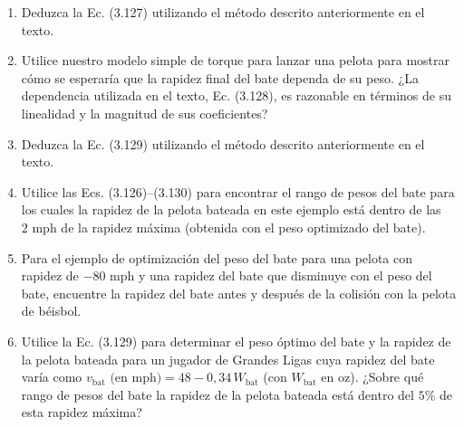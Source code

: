 \documentclass[12pt]{book}
\begin{document}
\begin{enumerate}
\item[3.159] Deduzca la Ec. (3.127) utilizando el método descrito anteriormente en el texto.

\item[3.160] Utilice nuestro modelo simple de torque para lanzar una pelota para mostrar cómo se esperaría que la rapidez final del bate dependa de su peso. ¿La dependencia utilizada en el texto, Ec. (3.128), es razonable en términos de su linealidad y la magnitud de sus coeficientes?

\item[3.161] Deduzca la Ec. (3.129) utilizando el método descrito anteriormente en el texto.

\item[3.162] Utilice las Ecs. (3.126)--(3.130) para encontrar el rango de pesos del bate para los cuales la rapidez de la pelota bateada en este ejemplo está dentro de las $2\text{ mph}$ de la rapidez máxima (obtenida con el peso optimizado del bate).

\item[3.163] Para el ejemplo de optimización del peso del bate para una pelota con rapidez de $-80\text{ mph}$ y una rapidez del bate que disminuye con el peso del bate, encuentre la rapidez del bate antes y después de la colisión con la pelota de béisbol.

\item[3.164] Utilice la Ec. (3.129) para determinar el peso óptimo del bate y la rapidez de la pelota bateada para un jugador de Grandes Ligas cuya rapidez del bate varía como $v_{\text{bat}}\text{ (en mph)} = 48 - 0{,}34\,W_{\text{bat}}$ (con $W_{\text{bat}}$ en $\text{oz}$). ¿Sobre qué rango de pesos del bate la rapidez de la pelota bateada está dentro del $5\%$ de esta rapidez máxima?


\end{enumerate}
\end{document}
